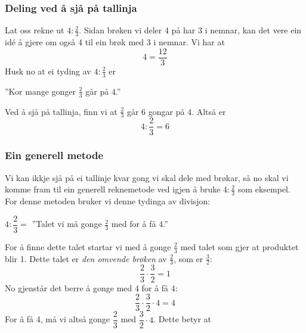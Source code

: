 \section{\brdelmbr}
\subsubsection{Deling ved å sjå på tallinja}
Lat oss rekne ut $ 4:\frac{2}{3}  $. Sidan brøken vi deler 4 på har 3 i nemnar, kan det vere ein idé å gjere om også 4 til ein brøk med $ 3 $ i nemnar. Vi har at 
\[ 4=\dfrac{12}{3} \]
Husk no at ei tyding av $ 4:\frac{2}{3} $ er
\begin{center}
	''Kor mange gonger $ \frac{2}{3} $ går på 4.''
\end{center}
Ved å sjå på tallinja, finn vi at $ \frac{2}{3} $ går 6 gongar på 4. Altså er
\[ 4:\frac{2}{3}=6 \]
\newpage
\subsubsection{Ein generell metode}
Vi kan ikkje sjå på ei tallinje kvar gong vi skal dele med brøkar, så no skal vi komme fram til ein generell reknemetode ved igjen å bruke $ 4:\frac{2}{3} $ som eksempel. For denne metoden bruker vi denne tydinga av divisjon:
\begin{center}
	$  4:\dfrac{2}{3}= $ ''Talet vi må gonge $ \frac{2}{3} $ med for å få 4.''
\end{center}

For å finne dette talet startar vi med å gonge $ \frac{2}{3} $ med talet som gjer at produktet blir 1. Dette talet er \textit{den omvende brøken} av $ \frac{2}{3} $, som er $ \frac{3}{2} $:
\[ \frac{2}{3}\cdot\frac{3}{2}=1 \]
No gjenstår det berre å gonge med 4 for å få 4:
\[ \frac{2}{3}\cdot\frac{3}{2}\cdot4=4 \]
For å få 4, må vi altså gonge $ \dfrac{2}{3} $ med $ \dfrac{3}{2}\cdot4 $. Dette betyr at
\reg[\delmbr \label{delmbr}]{
Når vi deler eit tal med ein brøk, gongar vi talet med den omvende brøken.
}
\newpage
{}
\newpage
